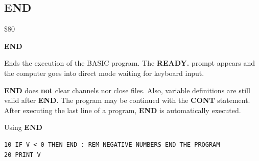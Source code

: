 \newpage
\subsection{END}
\begin{description}[leftmargin=2cm,style=nextline]
\item [Token:] \$80
\item [Format:] {\bf END}
\item [Usage:] Ends the execution
               of the BASIC program. The {\bf READY.} prompt
               appears and the computer goes into direct mode
               waiting for keyboard input.

\item [Remarks:]
               {\bf END} does {\bf not} clear channels nor close files.
               Also, variable definitions are still valid after {\bf END}.
               The program may be continued with the {\bf CONT}
               statement. After executing the last line of a
               program, {\bf END} is automatically executed.


\item [Example:]
                Using {\bf END}
\begin{tcolorbox}[colback=black,coltext=white]
\verbatimfont{\codefont}
\begin{verbatim}
10 IF V < 0 THEN END : REM NEGATIVE NUMBERS END THE PROGRAM
20 PRINT V
\end{verbatim}
\end{tcolorbox}
\end{description}


\newpage
